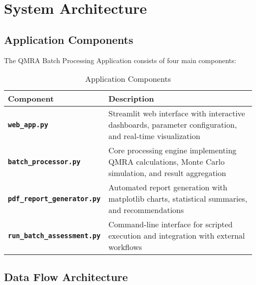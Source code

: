 \documentclass[11pt,a4paper]{article}
\begin{document}
\newpage

\section{System Architecture}

\subsection{Application Components}

The QMRA Batch Processing Application consists of four main components:

\begin{table}[H]
\centering
\caption{Application Components}
\begin{tabular}{>{\bfseries}p{4cm}p{10cm}}
\toprule
Component & Description \\
\midrule
\texttt{web\_app.py} & Streamlit web interface with interactive dashboards, parameter configuration, and real-time visualization \\
\texttt{batch\_processor.py} & Core processing engine implementing QMRA calculations, Monte Carlo simulation, and result aggregation \\
\texttt{pdf\_report\_generator.py} & Automated report generation with matplotlib charts, statistical summaries, and recommendations \\
\texttt{run\_batch\_assessment.py} & Command-line interface for scripted execution and integration with external workflows \\
\bottomrule
\end{tabular}
\end{table}

\subsection{Data Flow Architecture}
\end{document}

